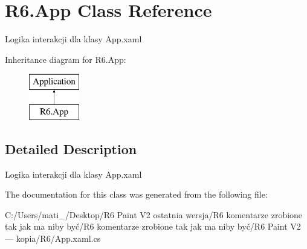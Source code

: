 \hypertarget{class_r6_1_1_app}{}\section{R6.\+App Class Reference}
\label{class_r6_1_1_app}


Logika interakcji dla klasy App.\+xaml  


Inheritance diagram for R6.\+App\+:\begin{figure}[H]
\begin{center}
\leavevmode
\includegraphics[height=2.000000cm]{class_r6_1_1_app}
\end{center}
\end{figure}


\subsection{Detailed Description}
Logika interakcji dla klasy App.\+xaml 



The documentation for this class was generated from the following file\+:\begin{DoxyCompactItemize}
\item 
C\+:/\+Users/mati\+\_\+/\+Desktop/\+R6 Paint V2 ostatnia wersja/\+R6 komentarze zrobione tak jak ma niby być/\+R6 komentarze zrobione tak jak ma niby być/\+R6 Paint V2 — kopia/\+R6/App.\+xaml.\+cs\end{DoxyCompactItemize}
